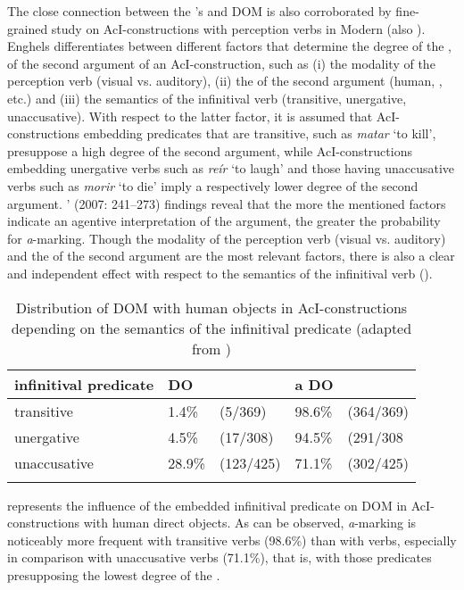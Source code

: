 \documentclass[output=paper]{LSP/langsci}
\begin{document}
The close connection between the ’s  and DOM is also corroborated by  fine-grained study on AcI-constructions with perception verbs in Modern  (\cf also \citealt[1792]{Torrego1999Gramatica}). Enghels differentiates between different factors that determine the  degree of the , \ie of the second argument of an AcI-construction, such as (i) the modality of the perception verb (visual vs. auditory), (ii) the  of the second argument (human, ,  etc.) and (iii) the semantics of the infinitival verb (transitive, unergative, unaccusative). With respect to the latter factor, it is assumed that AcI-constructions embedding predicates that are transitive, such as \textit{matar} ‘to kill’, presuppose a high  degree of the second argument, while AcI-constructions embedding unergative verbs such as \textit{reír} ‘to laugh’ and those having unaccusative verbs such as \textit{morir} ‘to die’ imply a respectively lower  degree of the second argument. \citeauthor{Enghels2007Modalites}’ (2007: 241--273) findings reveal that the more the mentioned factors indicate an agentive interpretation of the  argument, the greater the probability for \textit{a}-marking. Though the modality of the perception verb (visual vs. auditory) and the  of the second argument are the most relevant factors, there is also a clear and independent effect with respect to the semantics of the infinitival verb (\cf {}).


\begin{table}
\begin{tabularx}{\textwidth}{Xllll}
\lsptoprule
infinitival predicate &DO&  &a DO& \\
\midrule
transitive & 1.4\% & (5/369) & 98.6\% & (364/369)\\
unergative & 4.5\% & (17/308) & 94.5\% & (291/308\\
unaccusative & 28.9\% & (123/425) & 71.1\% & (302/425)\\
\lspbottomrule
\end{tabularx}
\caption{Distribution of DOM with human objects in AcI-constructions depending on the semantics of the infinitival predicate (adapted from \citealt[268]{Enghels2007Modalites})}\label{08-ga-tab:10}
\end{table}

 represents the influence of the embedded infinitival predicate on DOM in AcI-constructions with human direct objects. As can be observed, \textit{a}-marking is noticeably more frequent with transitive verbs (98.6\%) than with  verbs, especially in comparison with unaccusative verbs (71.1\%), that is, with those predicates presupposing the lowest  degree of the .
\end{document}
